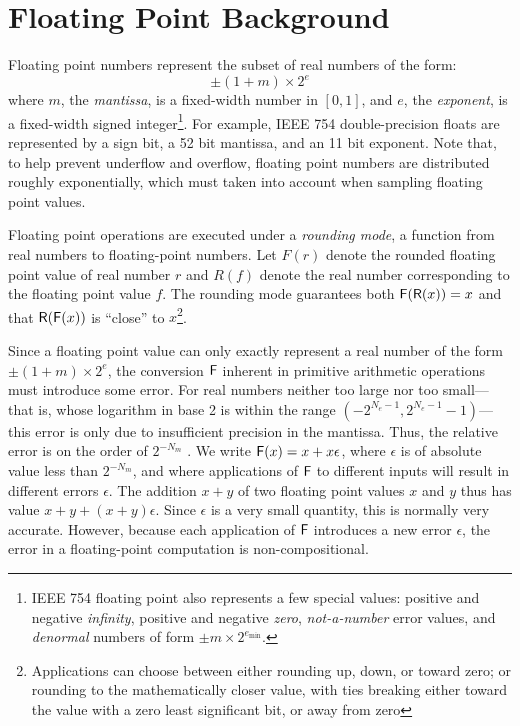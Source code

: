 \documentclass[paper.tex]{subfiles}
\begin{document}

\section{Floating Point Background}
\label{sec:background}

Floating point numbers represent the subset of real numbers of the
form:
\[ \pm (1 + m) \times 2^e \]%
where $m$, the \emph{mantissa}, is a fixed-width number in $[0, 1]$,
and $e$, the \emph{exponent}, is a fixed-width signed
integer\footnote{IEEE 754 floating point also represents a few special
  values: positive and negative \emph{infinity}, positive and negative
  \emph{zero}, \emph{not-a-number} error values, and \emph{denormal}
  numbers of form $\pm m \times 2^{e_{\text{min}}}$.}.  For example,
IEEE 754 double-precision floats are represented by a sign bit, a 52
bit mantissa, and an 11 bit exponent.  Note that, to help prevent
underflow and overflow, floating point numbers are distributed roughly
exponentially, which must taken into account when sampling floating
point values.

Floating point operations are executed under a \textit{rounding mode},
a function from real numbers to floating-point numbers. Let $F(r)$
denote the rounded floating point value of real number $r$ and $R(f)$
denote the real number corresponding to the floating point value
$f$. The rounding mode guarantees both $\mathsf{F}(\mathsf{R}(x)) = x$ and that
$\mathsf{R}(\mathsf{F}(x))$ is ``close'' to $x$\footnote{Applications can choose
  between either rounding up, down, or toward zero; or rounding to the
  mathematically closer value, with ties breaking either toward the
  value with a zero least significant bit, or away from zero}.

Since a floating point value can only exactly represent a real number
of the form $\pm(1 + m) \times 2^e$, the conversion $\mathsf{F}$ inherent in
primitive arithmetic operations must introduce some error.  For real
numbers neither too large nor too small---%
that is, whose logarithm in base 2 is within the range $(-2^{N_e-1},
2^{N_e-1} - 1)$---%
this error is only due to insufficient precision in the mantissa.
Thus, the relative error is on the order of $2^{-N_m}$ .  We write $\mathsf{F}(x) = x + x\epsilon$, where $\epsilon$
is of absolute value less than $2^{-N_m}$, and where applications of
$\mathsf{F}$ to different inputs will result in different errors $\epsilon$.
The addition $x + y$ of two floating point values $x$ and $y$
thus has value $x + y + (x + y)\epsilon$.  Since $\epsilon$ is a very
small quantity, this is normally very accurate.  However, because each
application of $\mathsf{F}$ introduces a new error $\epsilon$, the error in a
floating-point computation is non-compositional.
\end{document}
